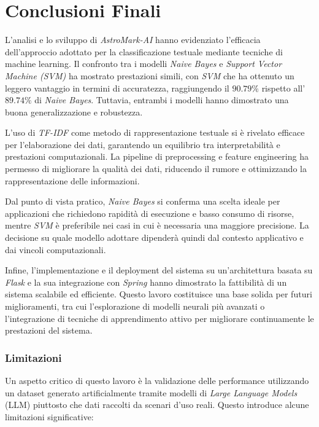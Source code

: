 \chapter{Conclusioni Finali}
L'analisi e lo sviluppo di \textit{AstroMark-AI} hanno evidenziato l'efficacia dell'approccio adottato per la classificazione testuale mediante tecniche di machine learning. Il confronto tra i modelli \textit{Naive Bayes} e \textit{Support Vector Machine (SVM)} ha mostrato prestazioni simili, con \textit{SVM} che ha ottenuto un leggero vantaggio in termini di accuratezza, raggiungendo il $90.79\%$ rispetto all'$89.74\%$ di \textit{Naive Bayes}. Tuttavia, entrambi i modelli hanno dimostrato una buona generalizzazione e robustezza.

L'uso di \textit{TF-IDF} come metodo di rappresentazione testuale si è rivelato efficace per l'elaborazione dei dati, garantendo un equilibrio tra interpretabilità e prestazioni computazionali. La pipeline di preprocessing e feature engineering ha permesso di migliorare la qualità dei dati, riducendo il rumore e ottimizzando la rappresentazione delle informazioni.

Dal punto di vista pratico, \textit{Naive Bayes} si conferma una scelta ideale per applicazioni che richiedono rapidità di esecuzione e basso consumo di risorse, mentre \textit{SVM} è preferibile nei casi in cui è necessaria una maggiore precisione. La decisione su quale modello adottare dipenderà quindi dal contesto applicativo e dai vincoli computazionali.

Infine, l'implementazione e il deployment del sistema su un'architettura basata su \textit{Flask} e la sua integrazione con \textit{Spring} hanno dimostrato la fattibilità di un sistema scalabile ed efficiente. Questo lavoro costituisce una base solida per futuri miglioramenti, tra cui l'esplorazione di modelli neurali più avanzati o l'integrazione di tecniche di apprendimento attivo per migliorare continuamente le prestazioni del sistema.

\subsection{Limitazioni}
Un aspetto critico di questo lavoro è la validazione delle performance utilizzando un dataset generato artificialmente tramite modelli di \textit{Large Language Models} (LLM) piuttosto che dati raccolti da scenari d’uso reali. Questo introduce alcune limitazioni significative:

